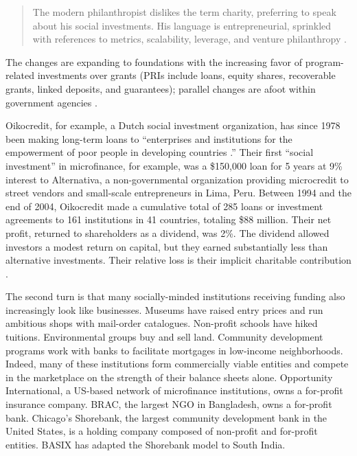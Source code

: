 \documentclass[letterpaper, 12pt]{article}
\begin{document}
\begin{quote}
The modern philanthropist dislikes the term charity, preferring to speak about his social investments. His language is entrepreneurial, sprinkled with references to metrics, scalability, leverage, and venture philanthropy \citep{weisberg2006}.
\end{quote}

The changes are expanding to foundations with the increasing favor of program-related investments over grants (PRIs include loans, equity shares, recoverable grants, linked deposits, and guarantees); parallel changes are afoot within government agencies \citep{marble1989}.


Oikocredit, for example, a Dutch social investment organization, has since 1978 been making long-term loans to ``enterprises and institutions for the empowerment of poor people in developing countries .'' Their first ``social investment'' in microfinance, for example, was a \$150,000 loan for 5 years at 9\% interest to Alternativa, a non-governmental organization providing microcredit to street vendors and small-scale entrepreneurs in Lima, Peru. Between 1994 and the end of 2004, Oikocredit made a cumulative total of 285 loans or investment agreements to 161 institutions in 41 countries, totaling \$88 million. Their net profit, returned to shareholders as a dividend, was 2\%. The dividend allowed investors a modest return on capital, but they earned substantially less than alternative investments. Their relative loss is their implicit charitable contribution \citep{heinen2005}.

The second turn is that many socially-minded institutions receiving funding also increasingly look like businesses. Museums have raised entry prices and run ambitious shops with mail-order catalogues. Non-profit schools have hiked  tuitions. Environmental groups buy and sell land. Community development programs work with banks to facilitate mortgages in low-income neighborhoods. Indeed, many of these institutions form commercially viable entities and compete in
the marketplace on the strength of their balance sheets alone. Opportunity International, a US-based network of microfinance institutions, owns a for-profit insurance company. BRAC, the largest NGO in Bangladesh, owns a for-profit bank. Chicago's Shorebank, the largest community development bank in the United States, is a holding company composed of non-profit and for-profit entities. BASIX has adapted the Shorebank model to South India.
\end{document}
